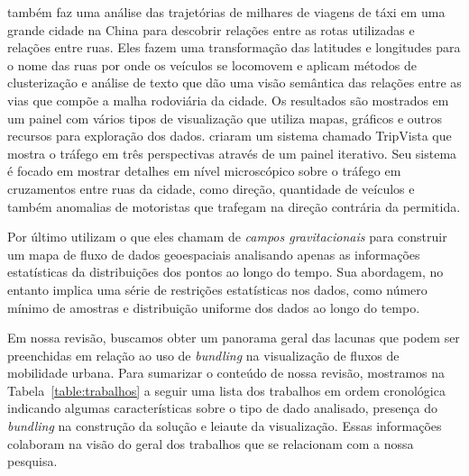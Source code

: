 \citet{Chu2014} também faz uma análise das trajetórias de milhares de viagens
de táxi em uma grande cidade na China para descobrir relações entre as rotas
utilizadas e relações entre ruas. Eles fazem uma transformação das latitudes e
longitudes para o nome das ruas por onde os veículos se locomovem e aplicam métodos de
clusterização e análise de texto que dão uma visão semântica das relações entre
as vias que compõe a malha rodoviária da cidade. Os resultados são mostrados em
um painel com vários tipos de visualização que utiliza mapas, gráficos e outros
recursos para exploração dos dados. \citet{Guo2011} criaram um sistema chamado
TripVista que mostra o tráfego em três perspectivas através de um painel
iterativo.  Seu sistema é focado em mostrar detalhes em nível microscópico
sobre o tráfego em cruzamentos entre ruas da cidade, como direção, quantidade
de veículos e também anomalias de motoristas que trafegam na direção contrária
da permitida. 

Por último \citet{Kim2018} utilizam o que eles chamam de \emph{campos
gravitacionais} para construir um mapa de fluxo de dados geoespaciais
analisando apenas as informações estatísticas da distribuições dos pontos ao
longo do tempo. Sua abordagem, no entanto implica uma série de restrições
estatísticas nos dados, como número mínimo de amostras e distribuição uniforme
dos dados ao longo do tempo.

Em nossa revisão, buscamos obter um panorama geral das lacunas que podem ser
preenchidas em relação ao uso de \emph{bundling} na visualização de fluxos de
mobilidade urbana. Para sumarizar o conteúdo de nossa revisão, mostramos na
Tabela~\ref{table:trabalhos} a seguir uma lista dos trabalhos em ordem
cronológica indicando algumas características sobre o tipo de dado analisado,
presença do \emph{bundling} na construção da solução e leiaute da visualização.
Essas informações colaboram na visão do geral dos trabalhos que se relacionam
com a nossa pesquisa.

